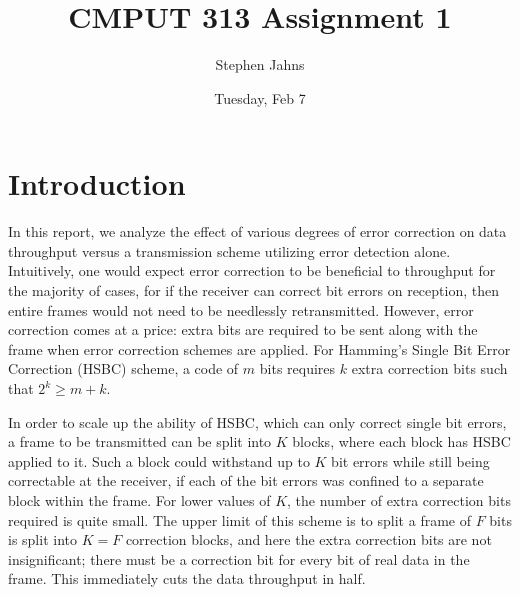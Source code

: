 \documentclass[twocolumn]{article}
\begin{document}
\lstset{
language=C,                             %
basicstyle=\ttfamily,                   %
numbers=left,                           %
numberstyle=\tiny,                      %
stepnumber=1,                           %
numbersep=5pt,                          %
frame=none,                             %
tabsize=2,                              %
captionpos=b,                           %
breaklines=true,                        %
breakatwhitespace=false,                %
showspaces=false,                       %
showtabs=false,                         %
columns=flexible                        %
}

\title{CMPUT 313 Assignment 1}
\date{Tuesday, Feb 7}
\author{Stephen Jahns}

\maketitle

\section*{Introduction}

    In this report, we analyze the effect of various degrees of error correction on data 
    throughput versus a transmission scheme utilizing error detection alone. Intuitively,
    one would expect error correction to be beneficial to throughput for the majority of cases,
    for if the receiver can correct bit errors on reception, then entire frames would not 
    need to be needlessly retransmitted. However, error correction comes at a price: extra bits
    are required to be sent along with the frame when error correction schemes are applied.
    For Hamming's Single Bit Error Correction (HSBC) scheme, a code of $m$ bits requires 
    $k$ extra correction bits such that $2^k \geq m + k$. 

    In order to scale up the ability of HSBC, which can only correct single bit errors, 
    a frame to be transmitted can be split into $K$ blocks, where each block has HSBC applied
    to it. Such a block could withstand up to $K$ bit errors while still being correctable 
    at the receiver, if each of the bit errors was confined to a separate block within the 
    frame. For lower values of $K$, the number of extra correction bits required is quite small.
    The upper limit of this scheme is to split a frame of $F$ bits is split into $K = F$
    correction blocks, and here the extra correction bits are not insignificant; there must be a 
    correction bit
    for every bit of real data in the frame. This immediately cuts the data throughput in
    half.
\end{document}
